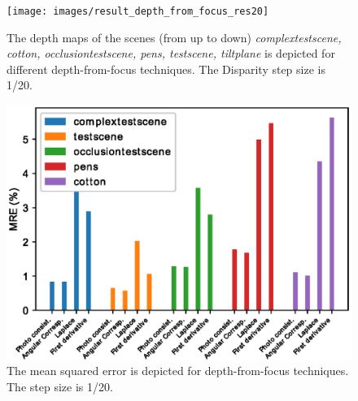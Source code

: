 \documentclass  [
  paper    = a4,
  BCOR     = 10mm,
  twoside,
  fontsize = 12pt,
  fleqn,
  toc      = bibnumbered,
  toc      = listofnumbered,
  numbers  = noendperiod,
  headings = normal,
  listof   = leveldown,
  version  = 3.03
]                                       {scrreprt}
\begin{document}
	\begin{figure}
		\centering
		\texttt{[image: images/result\_depth\_from\_focus\_res20]}
		\caption[Depth from focus: depth maps]{The depth maps of the scenes (from up to down) \textit{complextestscene, cotton, occlusiontestscene, pens, testscene, tiltplane} is depicted for different depth-from-focus techniques. The Disparity step size is 1/20.}
		\label{fig:resultdepthfromfocus}
	\end{figure}

	\begin{figure}
		\centering
		\includegraphics[width=0.7\linewidth]{images/error_res20_all}
		\caption[Mean squared error for depth-from-focus techniques]{The mean squared error is depicted for depth-from-focus techniques. The step size is 1/20.}
		\label{fig:errorres20all}
	\end{figure}
	

	
	
	
	
	
	
\end{document}
